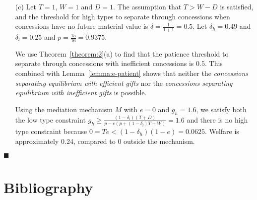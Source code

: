 \documentclass[12pt, letterpaper]{article}
\newcommand{\de}{\delta}
\begin{document}
{\begin{enumerate}
By Theorem~\ref{theorem:csemv}(a), the patience threshold to separate through concessions with efficient concessions is $0.75$. Using Lemma~\ref{lemma:e-patient}, we see that both the \emph{concessions separating equilibrium with efficient gifts} and the \emph{concessions separating equilibrium with inefficient gifts} are possible. 

Using the mediation mechanism $M$ with $e=0.18$ and $g_h=7.7669$, we satisfy both the low type constraint the $g_h\geq \frac{\left(1 - \de_l \right)\left(T +D \right)}{p - e\left(p +(1-\de_l)T +W \right)}=7.143$ and the high type constraint $g_h\leq \frac{ T + D - W}{Te - (1-\de_h)(1-e)}=7.7669$. Welfare is 12.82, compared to 7.5 in the \emph{concessions separating equilibrium with inefficient gifts} and 7.67 in the \emph{concessions separating equilibrium with inefficient gifts}.
		\item[(c)] Let $T = 1$, $W=1$ and $D = 1$. The assumption that $T > W - D$ is satisfied, and the threshold for high types to separate through concessions when concessions have no future material value is $\de = \frac{1}{1+1} = 0.5$. Let $\de_h = 0.49$ and $\de_l = 0.25$ and $p = \frac{15}{16} = 0.9375$. 

We use Theorem~\ref{theorem:2}(a) to find that the patience threshold to separate through concessions with inefficient concessions is $0.5$. This combined with Lemma~\ref{lemma:e-patient} shows that neither the \emph{concessions separating equilibrium with efficient gifts} nor the \emph{concessions separating equilibrium with inefficient gifts} is possible. 

Using the mediation mechanism $M$ with $e=0$ and $g_h=1.6$, we satisfy both the low type constraint $g_h\geq \frac{\left(1 - \de_l \right)\left(T +D \right)}{p - e\left(p +(1-\de_l)T +W \right)}=1.6$ and there is no high type constraint because $0=Te<(1-\de_h)(1-e)=0.0625$. Welfare is approximately 0.24, compared to 0 outside the mechanism.
	\end{enumerate}
	\hfill $\blacksquare$\\
										
\newpage
\section{Bibliography} 

\begin{list}{}{\setlength{\leftmargin}{0.0in}\setlength{\rightmargin}{0.0in}\setlength{\itemindent}{0.0in}\setlength{\itemsep}{0.05in}}


\end{list}}
\end{document}
